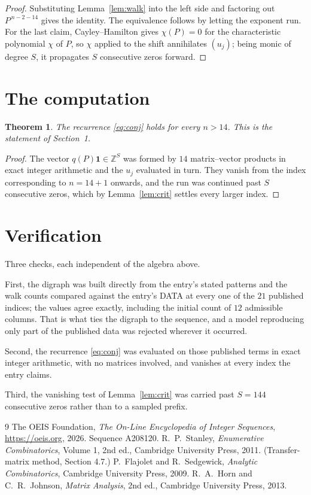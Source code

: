 \documentclass[11pt,a4paper]{article}
\theoremstyle{plain}
\newtheorem{theorem}{Theorem}
\theoremstyle{definition}
\begin{document}
\begin{proof}
Substituting Lemma~\ref{lem:walk} into the left side and factoring out
$P^{\,n-2-14}$ gives the identity. The equivalence follows by letting the exponent
run. For the last claim, Cayley--Hamilton gives $\chi(P)=0$ for the characteristic
polynomial $\chi$ of $P$, so $\chi$ applied to the shift annihilates $(u_j)$; being monic of
degree $S$, it propagates $S$ consecutive zeros forward.
\end{proof}

\section{The computation}

\begin{theorem}
The recurrence \eqref{eq:conj} holds for every $n>14$. This is the statement of
Section~1.
\end{theorem}

\begin{proof}
The vector $q(P)\mathbf{1}\in\mathbb{Z}^{S}$ was formed by $14$ matrix--vector
products in exact integer arithmetic and the $u_j$ evaluated in turn. They vanish from the
index corresponding to $n=14+1$ onwards, and the run was continued past $S$ consecutive
zeros, which by Lemma~\ref{lem:crit} settles every larger index.
\end{proof}

\section{Verification}

Three checks, each independent of the algebra above.

First, the digraph was built directly from the entry's stated patterns and the walk counts
compared against the entry's DATA at every one of the $21$ published indices; the
values agree exactly, including the initial count of $12$ admissible columns. That is
what ties the digraph to the sequence, and a model reproducing only part of the published
data was rejected wherever it occurred.

Second, the recurrence \eqref{eq:conj} was evaluated on those published terms in exact
integer arithmetic, with no matrices involved, and vanishes at every index the entry claims.

Third, the vanishing test of Lemma~\ref{lem:crit} was carried past $S=144$ consecutive
zeros rather than to a sampled prefix.

\begin{thebibliography}{9}
 The OEIS Foundation, \emph{The On-Line Encyclopedia of Integer
Sequences}, \url{https://oeis.org}, 2026. Sequence A208120.
 R.~P.~Stanley, \emph{Enumerative Combinatorics}, Volume 1, 2nd ed.,
Cambridge University Press, 2011. (Transfer-matrix method, Section 4.7.)
 P.~Flajolet and R.~Sedgewick, \emph{Analytic Combinatorics}, Cambridge
University Press, 2009.
 R.~A.~Horn and C.~R.~Johnson, \emph{Matrix Analysis}, 2nd ed., Cambridge
University Press, 2013.
\end{thebibliography}
\end{document}
